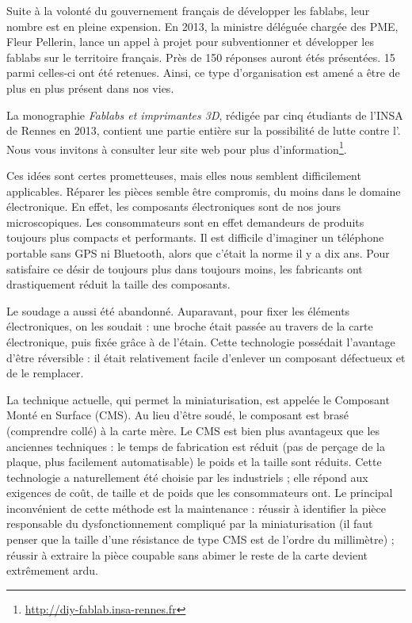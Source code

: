 \medbreak

Suite à la volonté du gouvernement français de développer les fablabs, leur nombre est en pleine expension. En 2013, la ministre déléguée chargée des PME, Fleur Pellerin, lance un appel à projet pour subventionner et développer les fablabs sur le territoire français. Près de 150 réponses auront étés présentées. 15 parmi celles-ci ont été retenues. Ainsi, ce type d'organisation est amené a être de plus en plus présent dans nos vies. 

La monographie \textit{Fablabs et imprimantes 3D}, rédigée par cinq étudiants de l'INSA de Rennes en 2013, contient une partie entière sur la possibilité de lutte contre l'\op. Nous vous invitons à consulter leur site web pour plus d'information\footnote{\url{http://diy-fablab.insa-rennes.fr}}.


\bigbreak 

Ces idées sont certes prometteuses, mais elles nous semblent difficilement applicables. Réparer les pièces semble être compromis, du moins dans le domaine électronique. En effet, les composants électroniques sont de nos jours microscopiques. Les consommateurs sont en effet demandeurs de produits toujours plus compacts et performants. Il est difficile d'imaginer un téléphone portable sans GPS ni Bluetooth, alors que c'était la norme il y a dix ans. Pour satisfaire ce désir de toujours plus dans toujours moins, les fabricants ont drastiquement réduit la taille des composants. 

Le soudage a aussi été abandonné. Auparavant, pour fixer les éléments électroniques, on les soudait : une broche était passée au travers de la carte électronique, puis fixée grâce à de l'étain. Cette technologie possédait l'avantage d'être réversible : il était relativement facile d'enlever un composant défectueux et de le remplacer. 

La technique actuelle, qui permet la miniaturisation, est appelée le Composant Monté en Surface (CMS). Au lieu d'être soudé, le composant est brasé (comprendre collé) à la carte mère. Le CMS est bien plus avantageux que les anciennes techniques : le temps de fabrication est réduit (pas de perçage de la plaque, plus facilement automatisable) le poids et la taille  sont réduits. Cette technologie a naturellement été choisie par les industriels ; elle répond aux exigences de coût, de taille et de poids que les consommateurs ont.
\smallbreak
Le principal inconvénient de cette méthode est la maintenance : réussir à identifier la pièce responsable du dysfonctionnement compliqué par la miniaturisation (il faut penser que la taille d'une résistance de type CMS est de l'ordre du millimètre) ; réussir à extraire la pièce coupable sans abimer le reste de la carte devient extrêmement ardu. 

